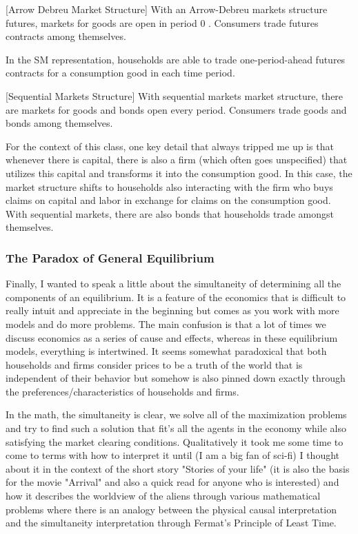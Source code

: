 \documentclass[11pt,english]{article}
\begin{document}
\begin{definition}{[Arrow Debreu Market Structure]}
With an Arrow-Debreu markets structure futures, markets for goods are open in period $0$ . Consumers trade futures contracts among themselves.
\end{definition}

In the SM representation, households are able to trade one-period-ahead futures contracts for a consumption good in each time period.

\begin{definition}{[Sequential Markets Structure]}
With sequential markets market structure, there are markets for goods and bonds open every period. Consumers trade goods and bonds among themselves.
\end{definition}

For the context of this class, one key detail that always tripped me up is that whenever there is capital, there is also a firm (which often goes unspecified) that utilizes this capital and transforms it into the consumption good. In this case, the market structure shifts to households also interacting with the firm who buys claims on capital and labor in exchange for claims on the consumption good. With sequential markets, there are also bonds that households trade amongst themselves.

\subsubsection{The Paradox of General Equilibrium}
Finally, I wanted to speak a little about the simultaneity of determining all the components of an equilibrium. It is a feature of the economics that is difficult to really intuit and appreciate in the beginning but comes as you work with more models and do more problems. The main confusion is that a lot of times we discuss economics as a series of cause and effects, whereas in these equilibrium models, everything is intertwined. It seems somewhat paradoxical that both households and firms consider prices to be a truth of the world that is independent of their behavior but somehow is also pinned down exactly through the preferences/characteristics of households and firms.

In the math, the simultaneity is clear, we solve all of the maximization problems and try to find such a solution that fit's all the agents in the economy while also satisfying the market clearing conditions. Qualitatively it took me some time to come to terms with how to interpret it until (I am a big fan of sci-fi) I thought about it in the context of the short story "Stories of your life" (it is also the basis for the movie "Arrival" and also a quick read for anyone who is interested) and how it describes the worldview of the aliens through various mathematical problems where there is an analogy between the physical causal interpretation and the simultaneity interpretation through Fermat's Principle of Least Time.
\end{document}
